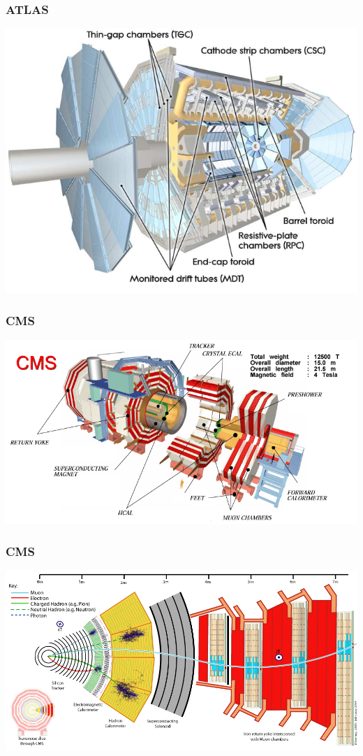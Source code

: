 \documentclass[compress]{beamer}
\begin{document}
\begin{frame}
\frametitle{ATLAS}
\includegraphics[width=\linewidth]{atlas_diagram.png}
\end{frame}

\begin{frame}
\frametitle{CMS}
\includegraphics[width=\linewidth]{cms_schematic.png}
\end{frame}

\begin{frame}
\frametitle{CMS}
\includegraphics[width=\linewidth]{cms_particles.png}
\end{frame}
\end{document}
